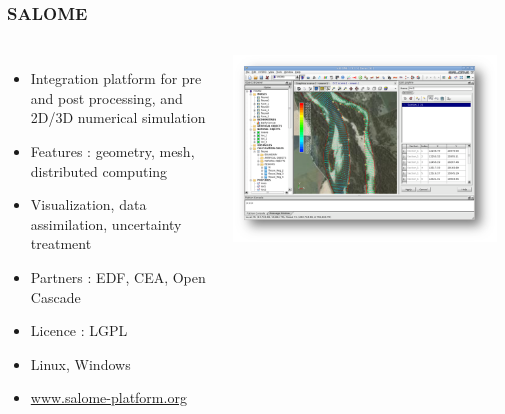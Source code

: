 \documentclass{beamer}
\begin{document}
\begin{frame}
\frametitle{SALOME}

  \begin{columns}
	
\begin{itemize}
\item Integration platform for pre and post processing, and 2D/3D numerical simulation 
\item Features : geometry, mesh, distributed computing
\item Visualization, data assimilation, uncertainty treatment
\item Partners : EDF, CEA, Open Cascade
\item Licence : LGPL
\item Linux, Windows
\item \url{www.salome-platform.org}
\end{itemize}


\begin{center}
\includegraphics[width=0.95\textwidth]{figures/Salome-hydro-platform}
\end{center}

	\end{columns}
\end{frame}


\end{document}
